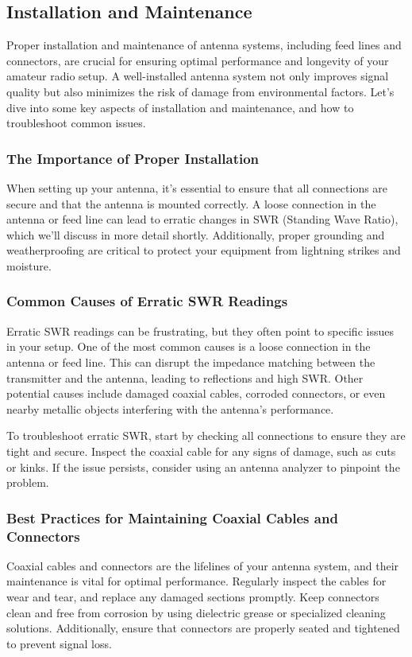 \subsection{Installation and Maintenance}
\label{subsec:install-maint}

Proper installation and maintenance of antenna systems, including feed lines and connectors, are crucial for ensuring optimal performance and longevity of your amateur radio setup. A well-installed antenna system not only improves signal quality but also minimizes the risk of damage from environmental factors. Let's dive into some key aspects of installation and maintenance, and how to troubleshoot common issues.

\subsubsection*{The Importance of Proper Installation}
When setting up your antenna, it's essential to ensure that all connections are secure and that the antenna is mounted correctly. A loose connection in the antenna or feed line can lead to erratic changes in SWR (Standing Wave Ratio), which we'll discuss in more detail shortly. Additionally, proper grounding and weatherproofing are critical to protect your equipment from lightning strikes and moisture.

\subsubsection*{Common Causes of Erratic SWR Readings}
Erratic SWR readings can be frustrating, but they often point to specific issues in your setup. One of the most common causes is a loose connection in the antenna or feed line. This can disrupt the impedance matching between the transmitter and the antenna, leading to reflections and high SWR. Other potential causes include damaged coaxial cables, corroded connectors, or even nearby metallic objects interfering with the antenna's performance.

To troubleshoot erratic SWR, start by checking all connections to ensure they are tight and secure. Inspect the coaxial cable for any signs of damage, such as cuts or kinks. If the issue persists, consider using an antenna analyzer to pinpoint the problem.

\subsubsection*{Best Practices for Maintaining Coaxial Cables and Connectors}
Coaxial cables and connectors are the lifelines of your antenna system, and their maintenance is vital for optimal performance. Regularly inspect the cables for wear and tear, and replace any damaged sections promptly. Keep connectors clean and free from corrosion by using dielectric grease or specialized cleaning solutions. Additionally, ensure that connectors are properly seated and tightened to prevent signal loss.

